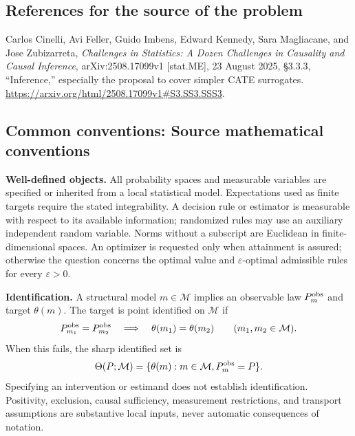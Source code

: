 \documentclass[11pt,a4paper]{article}
\begin{document}
\subsection*{References for the source of the problem}
Carlos Cinelli, Avi Feller, Guido Imbens, Edward Kennedy, Sara Magliacane, and Jose Zubizarreta, \emph{Challenges in Statistics: A Dozen Challenges in Causality and Causal Inference}, arXiv:2508.17099v1 [stat.ME], 23 August 2025, \S3.3.3, ``Inference,'' especially the proposal to cover simpler CATE surrogates. \url{https://arxiv.org/html/2508.17099v1#S3.SS3.SSS3}.

\subsection*{Common conventions: Source mathematical conventions}

\textbf{Well-defined objects.}
All probability spaces and measurable variables are specified or inherited
from a local statistical model. Expectations used as finite targets require
the stated integrability. A decision rule or estimator is measurable with
respect to its available information; randomized rules may use an auxiliary
independent random variable. Norms without a subscript are Euclidean in
finite-dimensional spaces. An optimizer is requested only when attainment
is assured; otherwise the question concerns the optimal value and
$\varepsilon$-optimal admissible rules for every $\varepsilon>0$.

\textbf{Identification.}
A structural model $m\in\mathcal M$ implies an observable law
$P_m^{\rm obs}$ and target $\theta(m)$. The target is point identified on
$\mathcal M$ if
\[
 P_{m_1}^{\rm obs}=P_{m_2}^{\rm obs}
 \quad\Longrightarrow\quad\theta(m_1)=\theta(m_2)
 \qquad(m_1,m_2\in\mathcal M).
\]
When this fails, the sharp identified set is
\[
 \Theta(P;\mathcal M)=\{\theta(m):m\in\mathcal M,
                                  P_m^{\rm obs}=P\}.
\]
Specifying an intervention or estimand does not establish identification.
Positivity, exclusion, causal sufficiency, measurement restrictions, and
transport assumptions are substantive local inputs, never automatic
consequences of notation.
\end{document}
